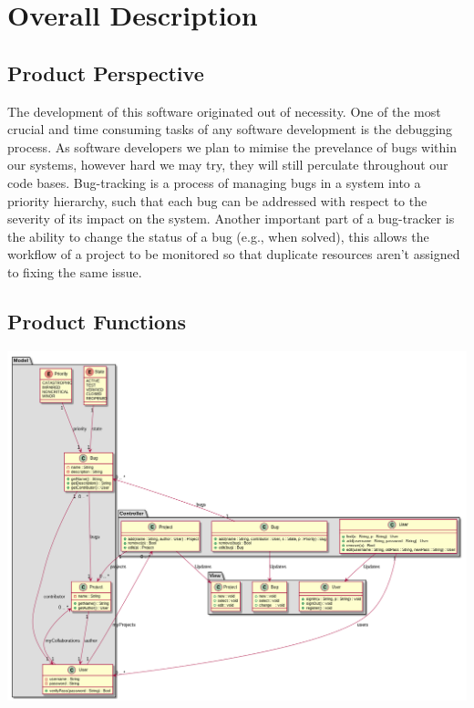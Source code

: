 \documentclass{article}
\newcommand{\comment}[1]{}
\begin{document}
\section{Overall Description}
\subsection{Product Perspective}
\comment{
Describe the context and origin of the product being specified in this \acrshort{srs}. For example, state whether this product is a follow-on member of a product family, a replacment for existing systems, or a new, self-contained product. If the \acrshort{srs} defines a component of a larger system, relate the requirments of the larger system to the functionality of this software and identift interfaces between the two. A simple diagram that shows the major components of the overall system, subsystem interconnections, and external interfaces can be helpful.
}
The development of this software originated out of necessity. One of the most crucial and time consuming tasks of any software development is the \gls{debugging} process. As software developers we plan to mimise the prevelance of bugs within our systems, however hard we may try, they will still perculate throughout our code bases. Bug-tracking is a process of managing bugs in a system into a priority hierarchy, such that each bug can be addressed with respect to the severity of its impact on the system. Another important part of a bug-tracker is the ability to change the status of a bug (e.g., when solved), this allows the workflow of a project to be monitored so that duplicate resources aren't assigned to fixing the same issue.

\subsection{Product Functions}
\comment{
	Summarize the major functions to the product must perform or must let the user perform. Details will be provided in Section 3, so only a high level summary (such as a bullet list) is needed here. Organize the functions to make them understandable to any ready of the SRS. A picture of the major groups of related requirements and how they relate, such as a top level data flow diagram or object class diagram, is often effective.
	}
\includegraphics[width=\textwidth]{classDiagram.png}
\end{document}
